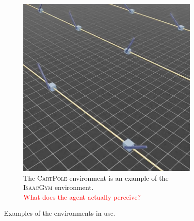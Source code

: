 \documentclass[10pt]{article} %
\begin{document}
\begin{figure}
\begin{subfigure}[b]{0.32\textwidth}
    \centering
    \includegraphics[width=\textwidth]{figures/isaac.png}
    \caption{The \textsc{CartPole} environment is an example of the \textsc{IsaacGym} environment.\\\textcolor{red}{What does the agent actually perceive?}\\}
    \label{fig:sample-env-isaac}
  \end{subfigure}
  \caption{Examples of the environments in use.}
  \label{fig:environmnents}
\end{figure}
\end{document}

